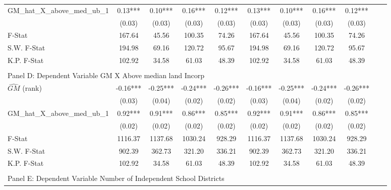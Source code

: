 \begin{table}[htbp]
\begin{threeparttable}
\begin{tabular}{l*{10}{c}}
\addlinespace
GM\_hat\_X\_above\_med\_ub\_1&       0.13***&       0.10***&       0.16***&       0.12***&       0.13***&       0.10***&       0.16***&       0.12***\\
                &     (0.03)   &     (0.03)   &     (0.03)   &     (0.03)   &     (0.03)   &     (0.03)   &     (0.03)   &     (0.03)   \\
\midrule
F-Stat          &     167.64   &      45.56   &     100.35   &      74.26   &     167.64   &      45.56   &     100.35   &      74.26   \\
S.W. F-Stat     &     194.98   &      69.16   &     120.72   &      95.67   &     194.98   &      69.16   &     120.72   &      95.67   \\
K.P. F-Stat     &     102.92   &      34.58   &      61.03   &      48.39   &     102.92   &      34.58   &      61.03   &      48.39   \\
\cmidrule[\heavyrulewidth](lr){1-9} \\ \cmidrule[\heavyrulewidth](lr){1-9}
\multicolumn{8}{l}{Panel D: Dependent Variable GM X Above median land Incorp}\\
\cmidrule(lr){1-9}
$\hat{GM}$ (rank)&      -0.16***&      -0.25***&      -0.24***&      -0.26***&      -0.16***&      -0.25***&      -0.24***&      -0.26***\\
                &     (0.03)   &     (0.04)   &     (0.02)   &     (0.02)   &     (0.03)   &     (0.04)   &     (0.02)   &     (0.02)   \\
\addlinespace
GM\_hat\_X\_above\_med\_ub\_1&       0.92***&       0.91***&       0.86***&       0.85***&       0.92***&       0.91***&       0.86***&       0.85***\\
                &     (0.02)   &     (0.02)   &     (0.02)   &     (0.02)   &     (0.02)   &     (0.02)   &     (0.02)   &     (0.02)   \\
\midrule
F-Stat          &    1116.37   &    1137.68   &    1030.24   &     928.29   &    1116.37   &    1137.68   &    1030.24   &     928.29   \\
S.W. F-Stat     &     902.39   &     362.73   &     321.20   &     336.21   &     902.39   &     362.73   &     321.20   &     336.21   \\
K.P. F-Stat     &     102.92   &      34.58   &      61.03   &      48.39   &     102.92   &      34.58   &      61.03   &      48.39   \\
\cmidrule[\heavyrulewidth](lr){1-9} \\ \cmidrule[\heavyrulewidth](lr){1-9}
\multicolumn{8}{l}{Panel E: Dependent Variable Number of Independent School Districts}\\

\end{tabular}
\end{threeparttable}
\end{table}
